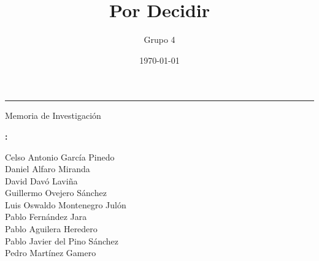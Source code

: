 \documentclass[12pt,twoside,open=right]{scrreprt}
\title{Por Decidir}
\author{Grupo 4}
\date{\today}
\newcommand{\authorfull}{
    Celso Antonio García Pinedo \\
    Daniel Alfaro Miranda \\
    David Davó Laviña \\
    Guillermo Ovejero Sánchez \\
    Luis Oswaldo Montenegro Julón \\
    Pablo Fernández Jara \\
    Pablo Aguilera Heredero \\
    Pablo Javier del Pino Sánchez \\
    Pedro Martínez Gamero
}
\begin{document}
\begin{titlepage}
\makeatletter
{
\centering
\vspace*{4cm}
{\fontsize{40pt}{40pt}\bfseries\scshape\@title\par}
{\rule{0.5\textwidth}{1pt}\par}


{\Huge Memoria de Investigación\par}

\vspace*{1cm}
{\Large\textbf{\@author :}  \par}
{\large\itshape 
\authorfull
\par}
}
\vfill
\makeatother
\end{titlepage}

\tableofcontents
\newpage







\end{document}
